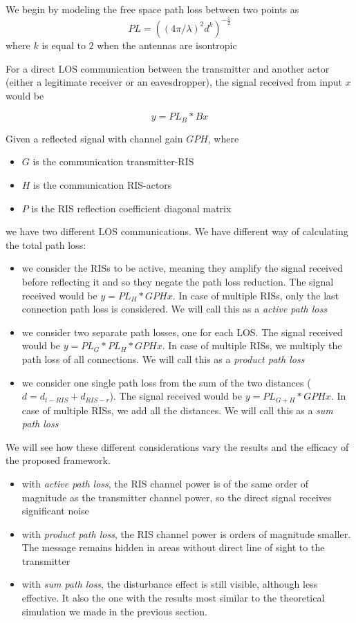 We begin by modeling the free space path loss \cite{Free_space_path_loss} between two points as
\begin{equation}
  PL = ((4 \pi / \lambda)^2 d^k)^{-\frac{1}{2}}
\end{equation}
where $k$ is equal to $2$ when the antennas are isontropic %

For a direct LOS communication between the transmitter and another actor (either a legitimate receiver or an eavesdropper), the signal received from input $x$ would be

\begin{equation}
  y = PL_B * Bx
\end{equation}

Given a reflected signal with channel gain $GPH$, where
\begin{itemize}
  \item $G$ is the communication transmitter-RIS
  \item $H$ is the communication RIS-actors
  \item $P$ is the RIS reflection coefficient diagonal matrix
\end{itemize}
we have two different LOS communications. We have different way of calculating the total path loss:
\begin{itemize}
  \item we consider the RISs to be active, meaning they amplify the signal received before reflecting it and so they negate the path loss reduction. The signal received would be $y = PL_H * GPHx$. In case of multiple RISs, only the last connection path loss is considered. We will call this as a \textit{active path loss}
  \item we consider two separate path losses, one for each LOS. The signal received would be $y = PL_G * PL_H * GPHx$. In case of multiple RISs, we multiply the path loss of all connections. We will call this as a \textit{product path loss}
  \item we consider one single path loss from the sum of the two distances ($d = d_{t-RIS} + d_{RIS-r}$). The signal received would be $y = PL_{G+H} * GPHx$. In case of multiple RISs, we add all the distances. We will call this as a \textit{sum path loss}
\end{itemize}

We will see how these different considerations vary the results and the efficacy of the proposed framework.
\begin{itemize}
  \item with \textit{active path loss}, the RIS channel power is of the same order of magnitude as the transmitter channel power, so the direct signal receives significant noise
  \item with \textit{product path loss}, the RIS channel power is orders of magnitude smaller. The message remains hidden in areas without direct line of sight to the transmitter
  \item with \textit{sum path loss}, the disturbance effect is still visible, although less effective. It also the one with the results most similar to the theoretical simulation we made in the previous section.
\end{itemize}

